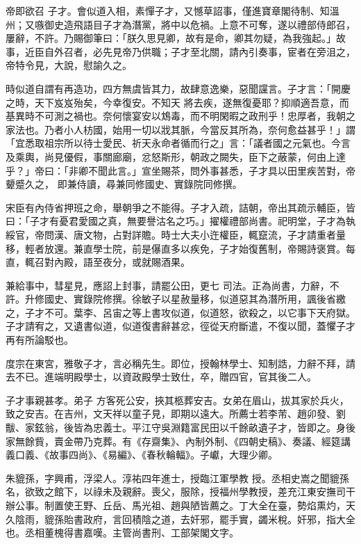 \begin{pinyinscope}
 帝即欲召
 子才。會似道入相，素憚子才，又憾草詔事，僅進寶章閣待制、知溫州；又嗾御史造飛語目子才為潛黨，將中以危禍。上意不可奪，遂以禮部侍郎召，屢辭，不許。乃賜御筆曰：「朕久思見卿，故有是命，卿其勿疑，為我強起。」故事，近臣自外召者，必先見帝乃供職；子才至北關，請內引奏事，宦者在旁沮之，帝特令見，大說，慰諭久之。



 時似道自謂有再造功，四方無虞皆其力，故肆意逸樂，惡聞讜言。子才言：「開慶之時，天下岌岌殆矣，今幸復安。不知天
 將去疾，遂無復憂耶？抑順適吾意，而基異時不可測之禍也。奈何懷宴安以鴆毒，而不明閑暇之政刑乎！忠厚者，我朝之家法也。乃者小人枋國，始用一切以戕其脈，今當反其所為，奈何愈益甚乎！」謂「宜悉取祖宗所以待士愛民、祈天永命者循而行之」言：「議者國之元氣也。今言及乘輿，尚見優假，事關廊廟，忿怒斯形，朝政之闕失，臣下之蔽蒙，何由上達乎？」帝曰：「非卿不聞此言。」宣坐賜茶，問外事甚悉，子才具以田里疾苦對，帝顰蹙久之，
 即兼侍讀，尋兼同修國史、實錄院同修撰。



 宋臣有內侍省押班之命，舉朝爭之不能得。子才入疏，詰朝，帝出其疏示輔臣，皆曰：「子才有憂君愛國之真，無要譽沽名之巧。」擢權禮部尚書。祀明堂，子才為執綏官，帝問漢、唐文物，占對詳贍。時士大夫小迕權臣，輒竄流，子才請重者量移，輕者放還。兼直學士院，前是儤直多以疾免，子才始復舊制，帝賜詩褒賞。每直，輒召對內殿，語至夜分，或就賜酒果。



 兼給事中，彗星見，應詔上封事，請罷公田，更七
 司法。正為尚書，力辭，不許。升修國史、實錄院修撰。徐敏子以星赦量移，似道惡其為潛所用，諷後省繳之，子才不可。葉李、呂宙之等上書攻似道，似道怒，欲殺之，以它事下天府獄。子才請宥之，又遺書似道，似道復書辭甚忿，徑從天府斷遣，不復以聞，蓋懼子才再有所論駁也。



 度宗在東宮，雅敬子才，言必稱先生。即位，授翰林學士、知制誥，力辭不拜，請去不已。進端明殿學士，以資政殿學士致仕，卒，贈四官，官其後二人。



 子才事親甚孝。弟子
 方客死公安，挾其柩葬安吉。女弟在眉山，拔其家於兵火，致之安吉。在吉州，文天祥以童子見，即期以遠大。所薦士若李芾、趙卯發、劉黻、家鉉翁，後皆為忠義士。平江守吳淵籍富民田以千餘畝遺子才，皆即之。身後家無餘貲，賣金帶乃克葬。有《存齋集》、內制外制、《四朝史稿》、奏議、經筵講義口義、《故事四尚》、《易編》、《春秋輪輻》。子巘，大理少卿。



 朱貔孫，字興甫，浮梁人。淳祐四年進士，授臨江軍學教
 授。丞相史嵩之聞貔孫名，欲致之館下，以祿未及親辭。喪父，服除，授福州學教授，差充江東安撫司干辦公事。制置使王野、丘岳、馬光祖、趙與陋皆薦之。丁大全在臺，勢焰熏灼，天久陰雨，貔孫貽書政府，言回積陰之道，去奸邪，罷手實，蠲米稅。奸邪，指大全也。丞相董槐得書嘉嘆。主管尚書刑、工部架閣文字。




\end{pinyinscope}
